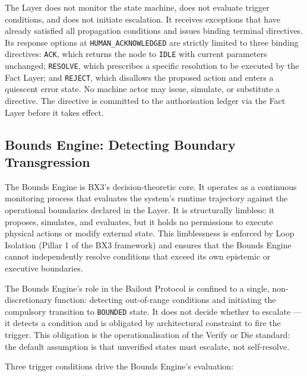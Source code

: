 The \purpose{} Layer does not monitor the state machine, does not evaluate trigger conditions, and does not initiate escalation. It receives exceptions that have already satisfied all propagation conditions and issues binding terminal directives. Its response options at \texttt{HUMAN\_ACKNOWLEDGED} are strictly limited to three binding directives: \texttt{ACK}, which returns the node to \texttt{IDLE} with current parameters unchanged; \texttt{RESOLVE}, which prescribes a specific resolution to be executed by the Fact Layer; and \texttt{REJECT}, which disallows the proposed action and enters a quiescent error state. No machine actor may issue, simulate, or substitute a directive. The directive is committed to the authorisation ledger via the Fact Layer before it takes effect.

\subsection{Bounds Engine: Detecting Boundary Transgression}
\label{sec:bounds-engine-triggering}

The Bounds Engine is BX3's decision-theoretic core. It operates as a continuous monitoring process that evaluates the system's runtime trajectory against the operational boundaries declared in the \purpose{} Layer. It is structurally limbless: it proposes, simulates, and evaluates, but it holds no permissions to execute physical actions or modify external state. This limblessness is enforced by Loop Isolation (Pillar 1 of the BX3 framework) and ensures that the Bounds Engine cannot independently resolve conditions that exceed its own epistemic or executive boundaries.

The Bounds Engine's role in the Bailout Protocol is confined to a single, non-discretionary function: detecting out-of-range conditions and initiating the compulsory transition to \texttt{BOUNDED} state. It does not decide whether to escalate — it detects a condition and is obligated by architectural constraint to fire the trigger. This obligation is the operationalisation of the Verify or Die standard: the default assumption is that unverified states must escalate, not self-resolve.

Three trigger conditions drive the Bounds Engine's evaluation:

